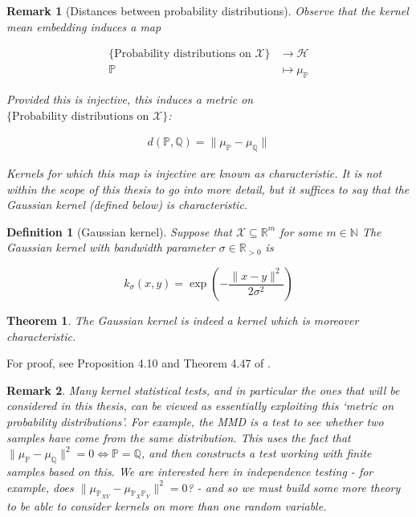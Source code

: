 \documentclass[12pt]{article}
\newtheorem*{remark}{Remark}
\newtheorem{definition}{Definition}
\newtheorem{theorem}{Theorem}
\numberwithin{claim}{section}
\numberwithin{lemma}{section}
\numberwithin{theorem}{section}
\begin{document}
\begin{remark}[Distances between probability distributions]
Observe that the kernel mean embedding induces a map 

\begin{align*}
\{\text{Probability distributions on } \mathcal{X}\}&\longrightarrow \mathcal{H} \\
\mathbb{P} &\mapsto \mu_{\mathbb{P}}
\end{align*}

Provided this is injective, this induces a metric on $\{\text{Probability distributions on } \mathcal{X}\}$:

\begin{align*}
d(\mathbb{P},\mathbb{Q}) = \|\mu_{\mathbb{P}}-\mu_{\mathbb{Q}}\|
\end{align*}

Kernels for which this map is injective are known as \emph{characteristic}\cite{sriperumbudur2011universality}. It is not within the scope of this thesis to go into more detail, but it suffices to say that the Gaussian kernel (defined below) is characteristic.

\end{remark}

\begin{definition}[Gaussian kernel]
Suppose that $\mathcal{X} \subseteq \mathbb{R}^m$ for some $m \in \mathbb{N}$ The Gaussian kernel with bandwidth parameter $\sigma \in \mathbb{R}_{>0}$ is

\[ k_\sigma (x,y) = \exp (-\frac{\|x-y\|^2}{2\sigma^2}) \]

\end{definition}

\begin{theorem}
The Gaussian kernel is indeed a kernel which is moreover characteristic.
\end{theorem}

For proof, see Proposition 4.10 and Theorem 4.47 of \cite{steinwart2008support}.

\begin{remark}
Many kernel statistical tests, and in particular the ones that will be considered in this thesis, can be viewed as essentially exploiting this `metric on probability distributions'. For example, the MMD \cite{gretton2012kernel} is a test to see whether two samples have come from the same distribution. This uses the fact that $\| \mu_\mathbb{P} - \mu_\mathbb{Q} \|^2 = 0 \iff \mathbb{P} = \mathbb{Q}$, and then constructs a test working with finite samples based on this. We are interested here in independence testing - for example, does $\|\mu_{\mathbb{P}_{XY}} - \mu_{\mathbb{P}_{X}\mathbb{P}_{Y}}\|^2 = 0$? - and so we must build some more theory to be able to consider kernels on more than one random variable.
\end{remark}
\end{document}
